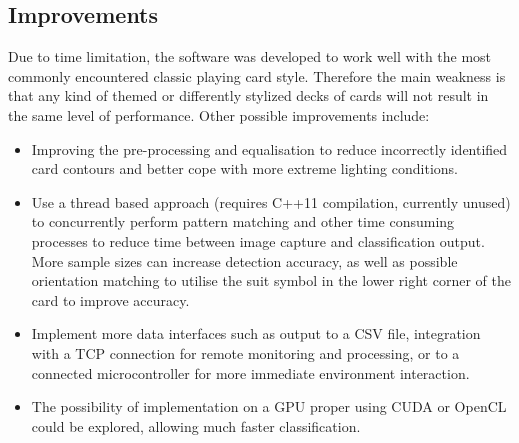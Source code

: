 \documentclass[a4paper,12pt,notitlepage]{article}
\begin{document}
	\subsection{Improvements}
		\label{sec:improvements}
		Due to time limitation, the software was developed to work well with the most commonly encountered classic playing card style. Therefore the main weakness is that any kind of themed or differently stylized decks of cards will not result in the same level of performance. Other possible improvements include:
		\begin{itemize}
			\item Improving the pre-processing and equalisation to reduce incorrectly identified card contours and better cope with more extreme lighting conditions.
			\item Use a thread based approach (requires C++11 compilation, currently unused) to concurrently perform pattern matching and other time consuming processes to reduce time between image capture and classification output. More sample sizes can increase detection accuracy, as well as possible orientation matching to utilise the suit symbol in the lower right corner of the card to improve accuracy.
			\item Implement more data interfaces such as output to a CSV file, integration with a TCP connection for remote monitoring and processing, or to a connected microcontroller for more immediate environment interaction. 
			\item The possibility of implementation on a GPU proper using CUDA or OpenCL could be explored, allowing much faster classification.
		\end{itemize}
\pagebreak
\thispagestyle{empty}
\printbibliography
\pagebreak
\end{document}
